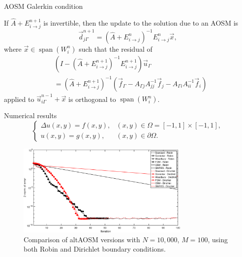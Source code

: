 \documentclass{beamer}
\newcommand{\Aij}{\left ( \hat{A} + E_{i \to j}^{n} \right )^{-1}}
\newcommand{\AijE}{\Aij E_{i \to j}^{n}}
\DeclareMathOperator{\Span}{span}
\begin{document}
\begin{frame}{AOSM Galerkin condition}

\begin{theorem} \label{thm: opt}
If $\hat{A} + E_{i \to j}^{n+1}$ is invertible, then the update to the solution due to an AOSM is $$\vec{d}_{j \Gamma}^{n+1} = \AijE \vec{x},$$ where
$\vec{x} \in  \Span(W_i^n)$ such that the residual of
\begin{align*}
	& \left ( I - \left ( \hat{A} + E_{i \to j}^{n+1} \right )^{-1} E_{i \to j}^{n+1} \right ) \vec{u}_\Gamma \\
	& = \left ( \hat{A} + E_{i \to j}^{n+1} \right )^{-1} \left ( \vec{f}_\Gamma - A_{\Gamma j} A_{jj}^{-1} \vec{f}_j - A_{\Gamma i} A_{ii}^{-1} \vec{f}_i \right )
\end{align*}
applied to $\vec{u}_{i \Gamma}^{n-1} + \vec{x}$ is orthogonal to $\Span(W_i^n)$. 
\end{theorem}
\end{frame}

\begin{frame}{Numerical results}
\begin{equation*}
	\begin{cases} \Delta u(x,y) = f(x,y), & (x,y) \in \Omega = [-1,1] \times [-1,1], \\
		u(x,y) = g(x,y), & (x,y) \in \partial \Omega. %
	\end{cases}
\end{equation*}
\begin{figure}
	\includegraphics[width=0.75\textwidth]{AOSM/PLOT_faltAOSMConv_Laplace.pdf}
	\caption{Comparison of altAOSM versions with $N=10,000$, $M=100$, using both Robin and Dirichlet boundary conditions.}
	\label{fig: compare altAOSM}
\end{figure}
\end{frame}
\end{document}
